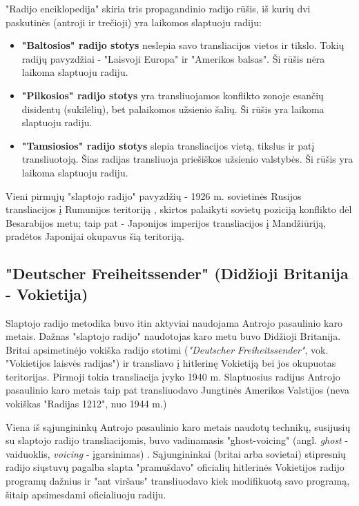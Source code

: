 \documentclass[kursinis-darbas]{vukf}
\begin{document}
"Radijo enciklopedija" skiria tris propagandinio radijo rūšis, iš kurių dvi paskutinės (antroji ir trečioji) yra laikomos slaptuoju radiju:

\begin{itemize}
	\item \textbf{"Baltosios" radijo stotys} neslepia savo transliacijos vietos ir tikslo. Tokių radijų pavyzdžiai - "Laisvoji Europa" ir "Amerikos balsas". Ši rūšis nėra laikoma slaptuoju radiju.
	\item \textbf{"Pilkosios" radijo stotys} yra transliuojamos konflikto zonoje esančių disidentų (sukilėlių), bet palaikomos užsienio šalių. Ši rūšis yra laikoma slaptuoju radiju.
	\item \textbf{"Tamsiosios" radijo stotys} slepia transliacijos vietą, tikslus ir patį transliuotoją. Šias radijas transliuoja priešiškos užsienio valstybės. Ši rūšis yra laikoma slaptuoju radiju.
\end{itemize}

Vieni pirmųjų "slaptojo radijo" pavyzdžių - 1926 m. sovietinės Rusijos transliacijos į Rumunijos teritoriją \cite[p.~1114]{chs_encyclopedia_of_radio}, skirtos palaikyti sovietų poziciją konflikto dėl Besarabijos metu; taip pat - Japonijos imperijos transliacijos į Mandžiūriją, pradėtos Japonijai okupavus šią teritoriją.

\subsection{"Deutscher Freiheitssender" (Didžioji Britanija - Vokietija)}

Slaptojo radijo metodika buvo itin aktyviai naudojama Antrojo pasaulinio karo metais. Dažnas "slaptojo radijo" naudotojas karo metu buvo Didžioji Britanija. Britai apsimetinėjo vokiška radijo stotimi (\emph{"Deutscher Freiheitssender"}, vok. "Vokietijos laisvės radijas") ir transliavo į hitlerinę Vokietiją bei jos okupuotas teritorijas. Pirmoji tokia transliacija įvyko 1940 m. Slaptuosius radijus Antrojo pasaulinio karo metais taip pat transliuodavo Jungtinės Amerikos Valstijos (neva vokiškas "Radijas 1212", nuo 1944 m.) \cite[p.~1115]{chs_encyclopedia_of_radio}

Viena iš sąjungininkų Antrojo pasaulinio karo metais naudotų technikų, susijusių su slaptojo radijo transliacijomis, buvo vadinamasis "ghost-voicing" (angl. \emph{ghost} - vaiduoklis, \emph{voicing} - įgarsinimas) \cite[p.~1115]{chs_encyclopedia_of_radio}. Sąjungininkai (britai arba sovietai) stipresnių radijo siųstuvų pagalba slapta "pramušdavo" oficialių hitlerinės Vokietijos radijo programų dažnius ir "ant viršaus" transliuodavo kiek modifikuotą savo programą, šitaip apsimesdami oficialiuoju radiju.
\end{document}
